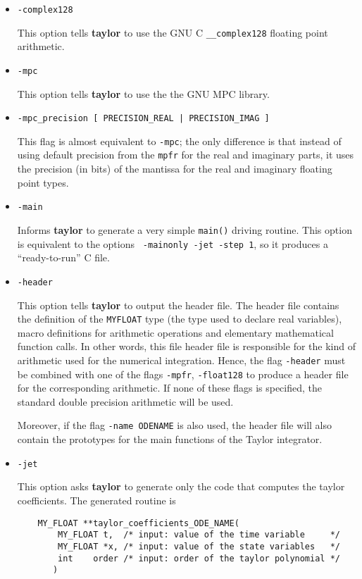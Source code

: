 \documentclass[10pt]{article}
\theoremstyle{remark}
\newcommand{\taylorname}{{\bf taylor}}
\newcommand{\myfloat}{{\tt MY\symbol{95}FLOAT}}
\begin{document}
\begin{itemize}
{{This option tells \taylorname{} to use the C standard for
\verb+long double complex+ floating point arithmetic.  }
}
\item {
{\verb+-complex128+

This option tells \taylorname{} to use the GNU C \verb+__complex128+
floating point arithmetic.  }
}
\item {
{\verb+-mpc+ 

This option tells \taylorname{} to use the the GNU MPC library.  }
}
\item {
{\verb+-mpc_precision [ PRECISION_REAL | PRECISION_IMAG ]+

This flag is almost equivalent to {\tt -mpc}; the only difference is
that instead of using default precision from the \verb+mpfr+ for the
real and imaginary parts, it uses the precision (in bits) of the
mantissa for the real and imaginary floating point types.}
}
\item {
{\verb+-main+

Informs \taylorname{} to generate a very simple \verb+main()+ driving
routine. This option is equivalent to the options {\tt
  -mainonly -jet -step 1}, so it produces a
``ready-to-run'' C file.  }
}
\item {
{\verb+-header+ 

This option tells \taylorname{} to output the header file. The header
file contains the definition of the \myfloat{} type (the type used to
declare real variables), macro definitions for arithmetic operations
and elementary mathematical function calls. In other words, this file
header file is responsible for the kind of arithmetic used for the
numerical integration.  Hence, the flag {\tt -header} must be combined
with one of the flags {\tt -mpfr}, {\tt -float128} to produce a header
file for the corresponding arithmetic. If none of these flags is
specified, the standard double precision arithmetic will be used.

Moreover, if the flag {\tt -name ODENAME} is also used, the
header file will also contain the prototypes for the main functions of
the Taylor integrator.}
}
\item {
{\verb+-jet+

This option asks \taylorname{} to generate only the code that computes
the taylor coefficients. The generated routine is

\begin{verbatim}
    MY_FLOAT **taylor_coefficients_ODE_NAME(
        MY_FLOAT t,  /* input: value of the time variable     */
        MY_FLOAT *x, /* input: value of the state variables   */
        int    order /* input: order of the taylor polynomial */
       )
\end{verbatim}

}}
\end{itemize}
\end{document}
